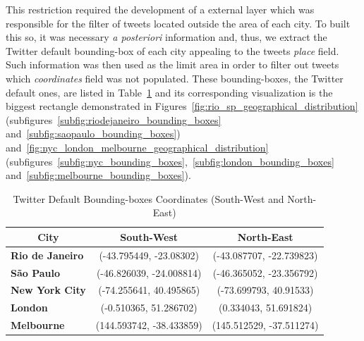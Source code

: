 This restriction required the development of a external layer which was responsible for the filter of tweets located outside the area of each city. To built this so, it was necessary \textit{a posteriori} information and, thus, we extract the Twitter default bounding-box of each city appealing to the tweets \textit{place} field. Such information was then used as the limit area in order to filter out tweets which \textit{coordinates} field was not populated. These bounding-boxes, the Twitter default ones, are listed in Table~\ref{tab:bbs_filter} and its corresponding visualization is the biggest rectangle demonstrated in Figures~\ref{fig:rio_sp_geographical_distribution} (subfigures~\ref{subfig:riodejaneiro_bounding_boxes} and~\ref{subfig:saopaulo_bounding_boxes}) and~\ref{fig:nyc_london_melbourne_geographical_distribution} (subfigures~\ref{subfig:nyc_bounding_boxes},~\ref{subfig:london_bounding_boxes} and~\ref{subfig:melbourne_bounding_boxes}).

\begin{table}[htbp]
	\centering
	\setlength\extrarowheight{3pt}
	\caption{Twitter Default Bounding-boxes Coordinates (South-West and North-East)}
	\label{tab:bbs_filter}
	\begin{tabular}{l|c|c}
		\hline
		\multicolumn{1}{c|}{\textbf{City}} & \textbf{South-West} & \textbf{North-East} \\ \hline
		\textbf{Rio de Janeiro} & (-43.795449, -23.08302) & (-43.087707, -22.739823) \\
		\textbf{São Paulo} & (-46.826039, -24.008814) & (-46.365052, -23.356792) \\
		\textbf{New York City} & (-74.255641, 40.495865) & (-73.699793, 40.91533) \\
		\textbf{London} & (-0.510365, 51.286702) & (0.334043, 51.691824) \\
		\textbf{Melbourne} & (144.593742, -38.433859) & (145.512529, -37.511274) \\ \hline
	\end{tabular}
\end{table}

